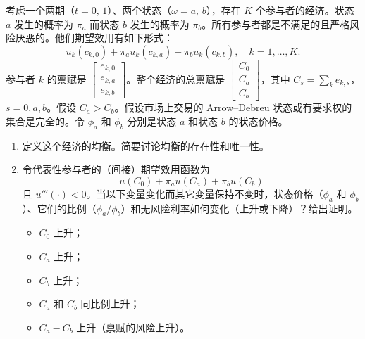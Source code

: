 
\begin{problem}
 考虑一个两期（$t=0,\,1$）、两个状态（$\omega=a,\,b$），存在 $K$ 个参与者的经济。状态 $a$ 发生的概率为 $\pi_{a}$ 而状态 $b$ 发生的概率为 $\pi_{b}$。所有参与者都是不满足的且严格风险厌恶的。他们期望效用有如下形式：
\[
    u_{k}(c_{k,0})+\pi_{a}u_{k}(c_{k,a})+\pi_{b}u_{k}(c_{k,b}),\quad k=1,\dots,K.
\]
参与者 $k$ 的禀赋是 $\begin{bmatrix}e_{k,0} \\ e_{k,a} \\ e_{k,b}\end{bmatrix}$。整个经济的总禀赋是 $\begin{bmatrix}C_{0} \\ C_{a} \\ C_{b}\end{bmatrix}$，其中 $C_{s}=\sum_{k}e_{k,s}$，$s=0,a,b$。假设 $C_{a}>C_{b}$。假设市场上交易的 Arrow--Debreu 状态或有要求权的集合是完全的。令 $\phi_{a}$ 和 $\phi_{b}$ 分别是状态 $a$ 和状态 $b$ 的状态价格。
\begin{enumerate}[label=(\alph*)]
    \item 定义这个经济的均衡。简要讨论均衡的存在性和唯一性。
    \item 令代表性参与者的（间接）期望效用函数为
    \[
        u(C_{0})+\pi_{a}u(C_{a})+\pi_{b}u(C_{b})
    \]
    且 $u'''(\cdot)<0$。当以下变量变化而其它变量保持不变时，状态价格（$\phi_{a}$ 和 $\phi_{b}$）、它们的比例（$\phi_{a}/\phi_{b}$）和无风险利率如何变化（上升或下降）？给出证明。
    \begin{itemize}
        \item $C_{0}$ 上升；
        \item $C_{a}$ 上升；
        \item $C_{b}$ 上升；
        \item $C_{a}$ 和 $C_{b}$ 同比例上升；
        \item $C_{a}-C_{b}$ 上升（禀赋的风险上升）。
    \end{itemize}
\end{enumerate}
\end{problem}
